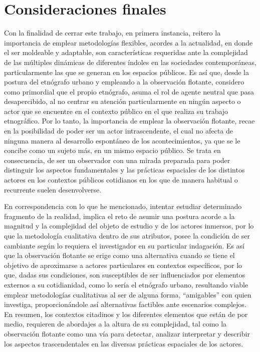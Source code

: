 \documentclass[
  spanish,
  11pt,
  a4paper,
]{scrbook}
\begin{document}
\section*{Consideraciones finales}\label{consideraciones-finales}


Con la finalidad de cerrar este trabajo, en primera instancia, reitero
la importancia de emplear metodologías flexibles, acordes a la
actualidad, en donde el ser moldeable y adaptable, son características
requeridas ante la complejidad de las múltiples dinámicas de diferentes
índoles en las sociedades contemporáneas, particularmente las que se
generan en los espacios públicos. Es así que, desde la postura del
etnógrafo urbano y empleando a la observación flotante, considero como
primordial que el propio etnógrafo, asuma el rol de agente neutral que
pasa desapercibido, al no centrar su atención particularmente en ningún
aspecto o actor que se encuentre en el contexto público en el que
realiza su trabajo etnográfico. Por lo tanto, la importancia de emplear
la observación flotante, recae en la posibilidad de poder ser un actor
intrascendente, el cual no afecta de ninguna manera al desarrollo
espontáneo de los acontecimientos, ya que se le concibe como un sujeto
más, en un mismo espacio público. Se trata en consecuencia, de ser un
observador con una mirada preparada para poder distinguir los aspectos
fundamentales y las prácticas espaciales de los distintos actores en los
contextos públicos cotidianos en los que de manera habitual o recurrente
suelen desenvolverse.

En correspondencia con lo que he mencionado, intentar estudiar
determinado fragmento de la realidad, implica el reto de asumir una
postura acorde a la magnitud y la complejidad del objeto de estudio y de
los actores inmersos, por lo que la metodología cualitativa dentro de
sus atributos, posee la condición de ser cambiante según lo requiera el
investigador en su particular indagación. Es así que la observación
flotante se erige como una alternativa cuando se tiene el objetivo de
aproximarse a actores particulares en contextos específicos, por lo que,
dadas sus condiciones, son susceptibles de ser influenciados por
elementos externos a su cotidianidad, como lo sería el etnógrafo urbano,
resultando viable emplear metodologías cualitativas al ser de alguna
forma, ``amigables'' con quien investiga, proporcionándole así
alternativas factibles ante escenarios complejos. En resumen, los
contextos citadinos y los diferentes elementos que están de por medio,
requieren de abordajes a la altura de su complejidad, tal como la
observación flotante como una vía para detectar, analizar interpretar y
describir los aspectos trascendentales en las diversas prácticas
espaciales de los actores.
\end{document}
